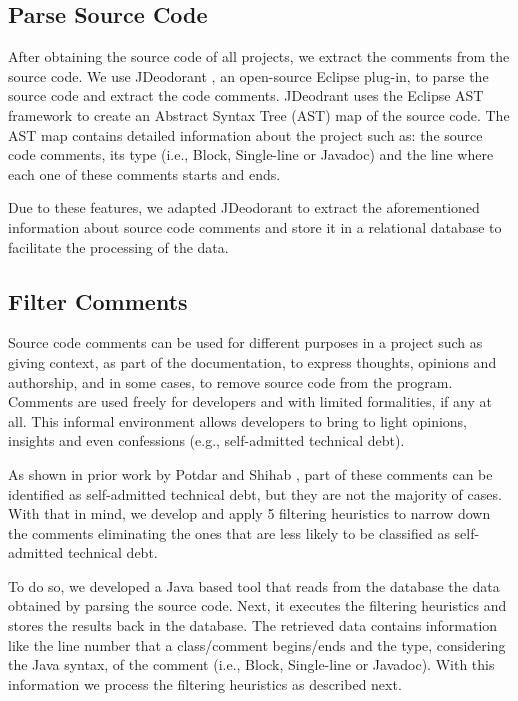 \subsection{Parse Source Code} %
\label{sub:parse_source_code}

After obtaining the source code of all projects, we extract the comments from the source code. We use JDeodorant \cite{Tsantalis2008CSMR}, an open-source Eclipse plug-in, to parse the source code and extract the code comments. JDeodrant uses the Eclipse AST framework to create an Abstract Syntax Tree (AST) map of the source code. The AST map contains detailed information about the project such as: the source code comments, its type (i.e., Block, Single-line or Javadoc) and the line where each one of these comments starts and ends. 

Due to these features, we adapted JDeodorant to extract the aforementioned information about source code comments and store it in a relational database to facilitate the processing of the data.

\subsection{Filter Comments} %
\label{sub:filter_comments}

Source code comments can be used for different purposes in a project such as giving context, as part of the documentation, to express thoughts, opinions and authorship, and in some cases, to remove source code from the program. Comments are used freely for developers and with limited formalities, if any at all. This informal environment allows developers to bring to light opinions, insights and even confessions (e.g., self-admitted technical debt). 

As shown in prior work by Potdar and Shihab \cite{Potdar2014ICSME}, part of these comments can be identified as self-admitted technical debt, but they are not the majority of cases. With that in mind, we develop and apply 5 filtering heuristics to narrow down the comments eliminating the ones that are less likely to be classified as self-admitted technical debt.

To do so, we developed a Java based tool that reads from the database the data obtained by parsing the source code. Next, it executes the filtering heuristics and stores the results back in the database. The retrieved data contains information like the line number that a class/comment begins/ends and the type, considering the Java syntax, of the comment (i.e., Block, Single-line or Javadoc). With this information we process the filtering heuristics as described next.

